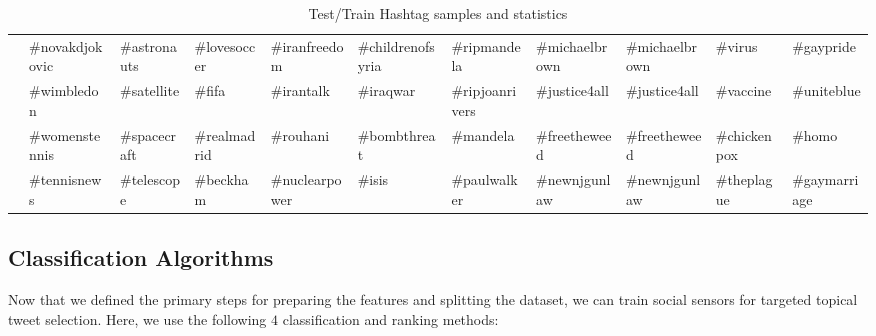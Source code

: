 \begin{table*}[tbh!]
{{\begin{tabular}{|l|l|l|l|l|l|l|l|l|l|l|}
                                          & \#novakdjokovic                      & \#astronauts                        & \#lovesoccer                         & \#iranfreedom                          & \#childrenofsyria                           & \#ripmandela                                 & \#michaelbrown                             & \#michaelbrown                                & \#virus                                 & \#gaypride                         \\ \cline{2-11} 
                                          & \#wimbledon                          & \#satellite                         & \#fifa                               & \#irantalk                             & \#iraqwar                                   & \#ripjoanrivers                              & \#justice4all                              & \#justice4all                                 & \#vaccine                               & \#uniteblue                        \\ \cline{2-11} 
                                          & \#womenstennis                       & \#spacecraft                        & \#realmadrid                         & \#rouhani                              & \#bombthreat                                & \#mandela                                    & \#freetheweed                              & \#freetheweed                                 & \#chickenpox                            & \#homo                             \\ \cline{2-11} 
                                          & \#tennisnews                         & \#telescope                         & \#beckham                            & \#nuclearpower                         & \#isis                                      & \#paulwalker                                 & \#newnjgunlaw                              & \#newnjgunlaw                                 & \#theplague                             & \#gaymarriage                      \\ \hline
\end{tabular}
}
}
\caption{Test/Train Hashtag samples and statistics}
\label{table:sampleHashtags}
\end{table*}

\subsection{Classification Algorithms}
Now that we defined the primary steps for preparing the features and splitting the dataset, we can train social sensors for targeted topical tweet selection. Here, we use the following $4$ classification and ranking methods: %

